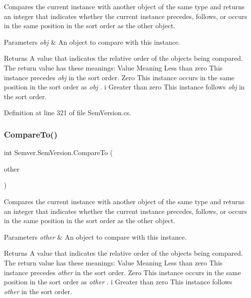 Compares the current instance with another object of the same type and returns an integer that indicates whether the current instance precedes, follows, or occurs in the same position in the sort order as the other object. 


\begin{DoxyParams}{Parameters}
{\em obj} & An object to compare with this instance.\\
\hline
\end{DoxyParams}
\begin{DoxyReturn}{Returns}
A value that indicates the relative order of the objects being compared. The return value has these meanings\+: Value Meaning Less than zero This instance precedes {\itshape obj}  in the sort order. Zero This instance occurs in the same position in the sort order as {\itshape obj} . i Greater than zero This instance follows {\itshape obj}  in the sort order. 
\end{DoxyReturn}


Definition at line 321 of file Sem\+Version.\+cs.

\mbox{\label{class_semver_1_1_sem_version_ad72682b72071f1a8fef88c7a978db04c}} 
\subsubsection{\texorpdfstring{CompareTo()}{CompareTo()}\hspace{0.1cm}{\footnotesize\ttfamily [2/2]}}
{\footnotesize\ttfamily int Semver.\+Sem\+Version.\+Compare\+To (\begin{DoxyParamCaption}\item[{\mbox{\hyperlink{class_semver_1_1_sem_version}{Sem\+Version}}}]{other }\end{DoxyParamCaption})}



Compares the current instance with another object of the same type and returns an integer that indicates whether the current instance precedes, follows, or occurs in the same position in the sort order as the other object. 


\begin{DoxyParams}{Parameters}
{\em other} & An object to compare with this instance.\\
\hline
\end{DoxyParams}
\begin{DoxyReturn}{Returns}
A value that indicates the relative order of the objects being compared. The return value has these meanings\+: Value Meaning Less than zero This instance precedes {\itshape other}  in the sort order. Zero This instance occurs in the same position in the sort order as {\itshape other} . i Greater than zero This instance follows {\itshape other}  in the sort order. 
\end{DoxyReturn}


